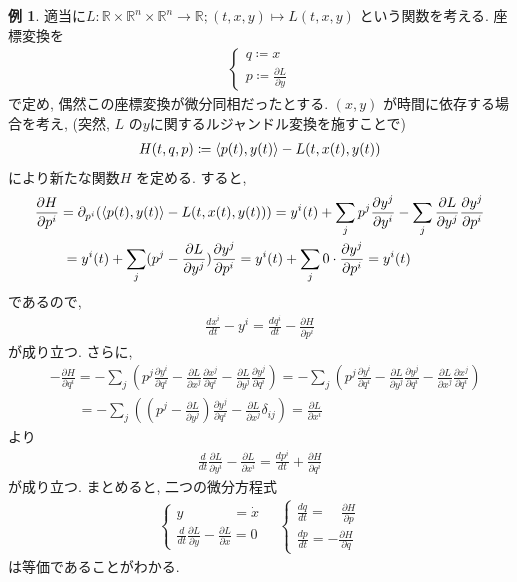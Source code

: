 \documentclass[10pt, fleqn, label-section=none]{bxjsarticle}
\theoremstyle{definition}
\newtheorem{ex}[dfn]{例}
\newcommand{\tbra}[1]{\mleft\langle#1\mright\rangle}
\renewcommand{\;}{\, ; \,}
\begin{document}
\begin{ex}  適当に$L: \mathbb R \times \mathbb R^n \times \mathbb R^n \rightarrow \mathbb R; (t, x, y) \mapsto L(t,x,y)$ という関数を考える. 座標変換を
\begin{align*} \begin{cases} q \coloneqq x \\ p \coloneqq \frac{\partial L}{\partial y}\end{cases} \end{align*}
で定め, 偶然この座標変換が微分同相だったとする. $(x,y)$ が時間に依存する場合を考え, (突然, $L$ の$y$に関するルジャンドル変換を施すことで)
\begin{align*} H(t,q,p) \coloneqq \tbra{p(t), y(t) } - L(t, x(t), y(t)) \end{align*}
により新たな関数$H$ を定める. すると, 
\begin{align*} &\frac{\partial H}{\partial p^i} = \partial_{p^i} (\tbra{p(t), y(t) } - L(t, x(t), y(t))) = y^i(t) + \sum_j p^j \frac{\partial y^j}{\partial y^i} - \sum_j \frac{\partial L}{\partial y^j}\frac{\partial y^j}{\partial p^i} \\&
\quad \quad = y^i(t) + \sum_j (p^j - \frac{\partial L}{\partial y^j} ) \frac{\partial y^j}{\partial p^i} = y^i(t) + \sum_j 0 \cdot \frac{\partial y^j}{\partial p^i}  = y^i(t)\end{align*}
であるので, 
\begin{align*} \frac{d x^i}{dt} - y^i = \frac{d q^i}{dt} - \frac{\partial H}{\partial p^i} \end{align*}
が成り立つ. さらに, 
\begin{align*} & - \frac{\partial H}{\partial q^i} =  - \sum_j (p^j \frac{\partial y^i}{\partial q^i} - \frac{\partial L}{\partial x^j} \frac{\partial x^j}{\partial q^i} - \frac{\partial L}{\partial y^j} \frac{\partial y^j}{\partial q^i} ) 
=  - \sum_j (p^j \frac{\partial y^i}{\partial q^i} - \frac{\partial L}{\partial y^j} \frac{\partial y^j}{\partial q^i}  - \frac{\partial L}{\partial x^j} \frac{\partial x^j}{\partial q^i} ) \\&\quad \quad 
=  - \sum_j (  ( p^j -  \frac{\partial L}{\partial y^j} ) \frac{\partial y^j}{\partial q^i} -  \frac{\partial L}{\partial x^j}   \delta_{ij}   ) = \frac{\partial L}{\partial x^i}\end{align*}
より
\begin{align*} \frac{d}{dt}\frac{\partial L}{\partial y^i} - \frac{\partial L}{\partial x^i} = \frac{d p^i}{dt} + \frac{\partial H}{\partial q^i} \end{align*}
が成り立つ. まとめると, 二つの微分方程式
\begin{align*} \begin{cases} y \hspace{42pt} =  \dot x \\ \frac{d}{dt}\frac{\partial L}{\partial y} - \frac{\partial L}{\partial x} = 0  \end{cases} \quad \begin{cases}  \frac{d q}{dt} =  \quad \frac{\partial H}{\partial p}  \\ \frac{d p}{dt} = - \frac{\partial H}{\partial q}\end{cases} \end{align*}
は等価であることがわかる.
\end{ex}
\end{document}
